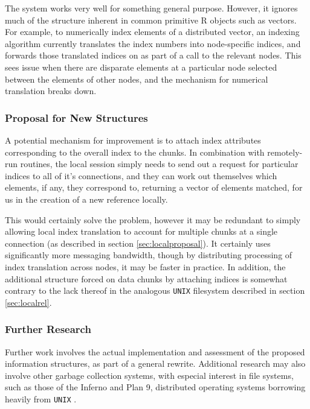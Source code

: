 The system works very well for something general purpose. However, it
ignores much of the structure inherent in common primitive R objects
such as vectors. For example, to numerically index elements of a
distributed vector, an indexing algorithm currently translates the index
numbers into node-specific indices, and forwards those translated
indices on as part of a call to the relevant nodes. This sees issue when
there are disparate elements at a particular node selected between the
elements of other nodes, and the mechanism for numerical translation
breaks down.

\hypertarget{proposal-for-new-structures}{%
\subsubsection{Proposal for New
Structures}\label{proposal-for-new-structures}}

A potential mechanism for improvement is to attach index attributes
corresponding to the overall index to the chunks. In combination with
remotely-run routines, the local session simply needs to send out a
request for particular indices to all of it's connections, and they can
work out themselves which elements, if any, they correspond to,
returning a vector of elements matched, for us in the creation of a new
reference locally.

This would certainly solve the problem, however it may be redundant to
simply allowing local index translation to account for multiple chunks
at a single connection (as described in section
\cref{sec:localproposal}). It certainly uses significantly more
messaging bandwidth, though by distributing processing of index
translation across nodes, it may be faster in practice. In addition, the
additional structure forced on data chunks by attaching indices is
somewhat contrary to the lack thereof in the analogous \texttt{UNIX}
filesystem described in section \cref{sec:localrel}.

\hypertarget{further-research}{%
\subsubsection{Further Research}\label{further-research}}

Further work involves the actual implementation and assessment of the
proposed information structures, as part of a general rewrite.
Additional research may also involve other garbage collection systems,
with especial interest in file systems, such as those of the Inferno and
Plan 9, distributed operating systems borrowing heavily from
\texttt{UNIX} \cite{dorward1997inferno}\cite{pike1995plan}.

